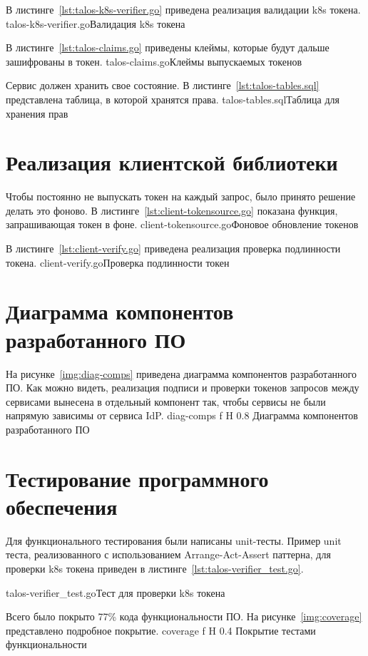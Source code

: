 \pagebreak
В листинге~\ref{lst:talos-k8s-verifier.go} приведена реализация валидации k8s токена.
	{talos-k8s-verifier.go}{Валидация k8s токена}

В листинге~\ref{lst:talos-claims.go} приведены клеймы, которые будут дальше зашифрованы в токен.
	{talos-claims.go}{Клеймы выпускаемых токенов}
	
Сервис должен хранить свое состояние. В листинге~\ref{lst:talos-tables.sql} представлена таблица, в которой хранятся права.
	{talos-tables.sql}{Таблица для хранения прав}
	
\section{Реализация клиентской библиотеки}
Чтобы постоянно не выпускать токен на каждый запрос, было принято решение делать это фоново. В листинге~\ref{lst:client-tokensource.go} показана функция, запрашивающая токен в фоне.
\pagebreak
{}
	{client-tokensource.go}{Фоновое обновление токенов}
	
В листинге~\ref{lst:client-verify.go} приведена реализация проверка подлинности токена.
\pagebreak
{}
	{client-verify.go}{Проверка подлинности токен}

\section{Диаграмма компонентов разработанного ПО}
На рисунке~\ref{img:diag-comps} приведена диаграмма компонентов разработанного ПО. Как можно видеть, реализация подписи и проверки токенов запросов между сервисами вынесена в отдельный компонент так, чтобы сервисы не были напрямую зависимы от сервиса IdP.
    {diag-comps}
    {f}
    {H}
    {0.8\textwidth}
    {Диаграмма компонентов разработанного ПО}

\section{Тестирование программного обеспечения}

Для функционального тестирования были написаны unit-тесты.
Пример unit теста, реализованного с использованием Arrange-Act-Assert паттерна, для проверки k8s токена приведен в листинге~\ref{lst:talos-verifier_test.go}.

\pagebreak
{}
	{talos-verifier_test.go}{Тест для проверки k8s токена}

Всего было покрыто 77\% кода функциональности ПО. На рисунке~\ref{img:coverage} представлено подробное покрытие.
    {coverage}
    {f}
    {H}
    {0.4\textwidth}
    {Покрытие тестами функциональности}
    
